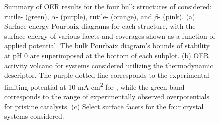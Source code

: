 \begin{figure}
\centering
{}
\caption{\label{fig:oer_volcano}
Summary of OER results for the four bulk structures of \IrOx considered: rutile- (green), $\alpha$- (purple), rutile- (orange), and $\beta$- (pink).
(a) Surface energy Pourbaix diagrams for each structure, with the surface energy of various facets and coverages shown as a function of applied potential.
The bulk Pourbaix diagram's bounds of stability at pH 0 are superimposed at the bottom of each subplot.
(b) OER activity volcano for \IrOx systems considered utilizing the \DGOmOH thermodynamic descriptor.
The purple dotted line corresponds to the experimental limiting potential at 10 mA cm\textsuperscript{2} for , %
while the green band corresponds to the range of experimentally observed overpotentials for pristine  catalysts.  %
(c) Select surface facets for the four \IrOx crystal systems considered.
}
\end{figure}


